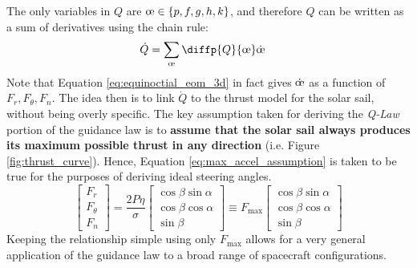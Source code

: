 The only variables in \(Q\) are \(\moe \in \{p, f, g, h, k\}\), and therefore \(Q\) can be written as a sum of derivatives using the chain rule:
\begin{align*}
  \dot{Q} & = \sum_{\moe} \diffp{Q}{{\moe}} \dot{\moe}
\end{align*}
Note that Equation \ref{eq:equinoctial_eom_3d} in fact gives \(\dot{\moe}\) as a function of \(F_r, F_\theta, F_n\). The idea then is to link \(\dot{Q}\) to the thrust model for the solar sail, without being overly specific. The key assumption taken for deriving the \textit{\textit{Q-Law}} portion of the guidance law is to \textbf{assume that the solar sail always produces its maximum possible thrust in any direction} (i.e. Figure \ref{fig:thrust_curve}). Hence, Equation \ref{eq:max_accel_assumption} is taken to be true for the purposes of deriving ideal steering angles.
\begin{equation}
  \begin{bmatrix}
    F_r      \\
    F_\theta \\
    F_n
  \end{bmatrix} =
  \frac{2P\eta}{\sigma}
  \begin{bmatrix}
    \cos \beta \sin \alpha \\
    \cos \beta \cos \alpha \\
    \sin \beta
  \end{bmatrix}
  \equiv
  F_{\max}
  \begin{bmatrix}
    \cos \beta \sin \alpha \\
    \cos \beta \cos \alpha \\
    \sin \beta
  \end{bmatrix}
  \label{eq:max_accel_assumption}
\end{equation}
Keeping the relationship simple using only \(F_{\max}\) allows for a very general application of the guidance law to a broad range of spacecraft configurations.


